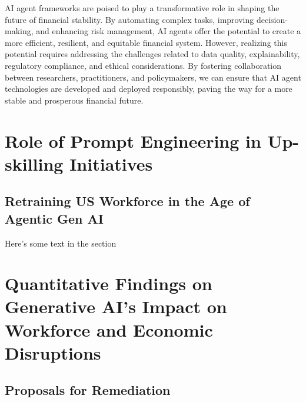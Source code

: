 \documentclass[a4paper,headinclude=on,footinclude=on,12pt,oneside]{scrbook}
\begin{document}
																AI agent frameworks are poised to play a transformative role in shaping the future of financial stability. By automating complex tasks, improving decision-making, and enhancing risk management, AI agents offer the potential to create a more efficient, resilient, and equitable financial system. However, realizing this potential requires addressing the challenges related to data quality, explainability, regulatory compliance, and ethical considerations. By fostering collaboration between researchers, practitioners, and policymakers, we can ensure that AI agent technologies are developed and deployed responsibly, paving the way for a more stable and prosperous financial future.



\chapter{ Role of Prompt Engineering in Up-skilling Initiatives}

\section{Retraining US Workforce in the Age of Agentic Gen AI}

Here's some text in the section

\chapter{Quantitative Findings on Generative AI’s Impact on Workforce and Economic Disruptions}

\section{Proposals for Remediation}
\end{document}
